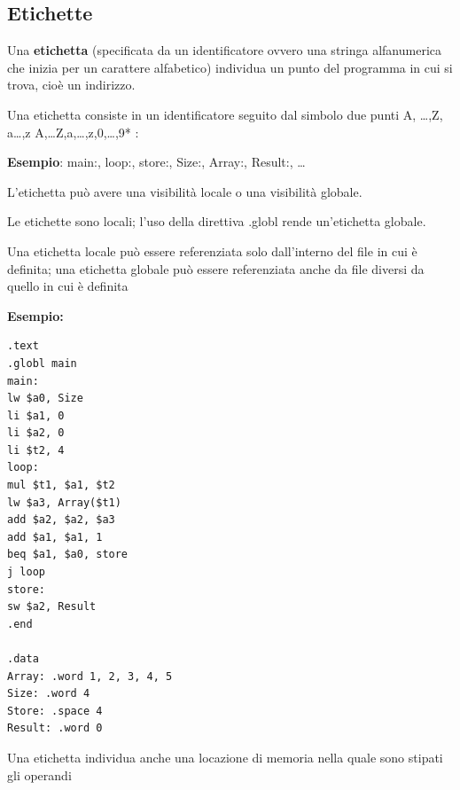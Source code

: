 \documentclass[12pt]{article} %
\begin{document}
\subsection{Etichette}
Una \textbf{etichetta} (specificata da un identificatore ovvero una stringa alfanumerica che inizia per un carattere alfabetico) individua un punto del programma in cui si trova, cioè un indirizzo.\par\medskip\noindent
Una etichetta consiste in un identificatore seguito dal simbolo due punti {A, …,Z, a…,z} {A,…Z,a,…,z,0,…,9}* {:} \par\medskip\noindent\textbf{Esempio}: main:, loop:, store:, Size:, Array:, Result:, …\par\medskip\noindent
L’etichetta può avere una visibilità locale o una visibilità globale.\par\medskip\noindent
Le etichette sono locali; l’uso della direttiva .globl rende un’etichetta globale.\par\medskip\noindent
Una etichetta locale può essere referenziata solo dall’interno del file in cui è definita; una etichetta globale può essere referenziata anche da file diversi da quello in cui è definita\par\medskip\noindent
\newpage
\noindent \textbf{Esempio:}
\begin{lstlisting}
.text
.globl main
main:
lw $a0, Size
li $a1, 0
li $a2, 0
li $t2, 4
loop:
mul $t1, $a1, $t2
lw $a3, Array($t1)
add $a2, $a2, $a3
add $a1, $a1, 1
beq $a1, $a0, store
j loop
store:
sw $a2, Result
.end

.data
Array: .word 1, 2, 3, 4, 5
Size: .word 4
Store: .space 4
Result: .word 0
\end{lstlisting}
\vspace{\baselineskip}
Una etichetta individua anche una locazione di memoria nella quale sono stipati gli operandi
\end{document}

